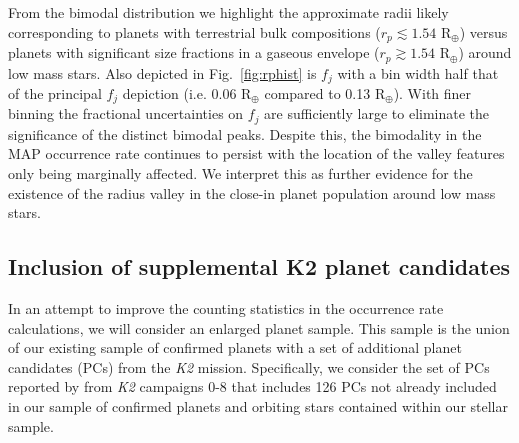 \documentclass[twocolumn]{emulateapj}
\newcommand{\ktwo}[1]{\emph{K2}#1}
\begin{document}
From the bimodal distribution we highlight the approximate radii likely corresponding to planets with terrestrial
bulk compositions ($r_p\lesssim 1.54$ R$_{\oplus}$) versus planets with significant size fractions in a gaseous
envelope ($r_p\gtrsim 1.54$ R$_{\oplus}$) around
low mass stars. Also depicted in Fig.~\ref{fig:rphist} is $f_j$ with a bin width half that of the principal
$f_j$ depiction (i.e. 0.06 R$_{\oplus}$ compared to 0.13 R$_{\oplus}$).
With finer binning the fractional uncertainties on $f_j$ are sufficiently
large to eliminate the significance of the distinct bimodal peaks. Despite this, the bimodality in the MAP
occurrence rate continues to persist with the location of the valley features only being marginally affected.
We interpret this as further evidence for the existence of the radius valley in the close-in planet population
around low mass stars.


\subsection{Inclusion of supplemental K2 planet candidates}
In an attempt to improve the counting statistics in the occurrence rate calculations,
we will consider an enlarged planet sample. This sample is the union of our existing sample of confirmed planets
with a set of additional planet candidates (PCs) from the \ktwo{}
mission. Specifically, we consider the set of PCs reported by \cite{kruse19}
from \ktwo{} campaigns 0-8 that includes 126 PCs not already included in our sample of confirmed planets
and orbiting stars contained within our stellar sample.
\end{document}
